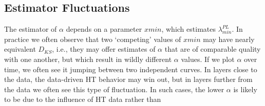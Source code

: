 
\subsection{Estimator Fluctuations}
The estimator of $\alpha$ depends on a parameter $xmin$, which estimates $\lambda_{min}^{PL}$. In practice we often 
observe that two `competing' values of $xmin$ may have nearly equivalent $D_{KS}$, i.e., they may offer estimates of 
$\alpha$ that are of comparable quality with one another, but which result in wildly different $\alpha$ values. If we 
plot $\alpha$ over time, we often see it jumping between two independent curves. In layers close to the data, the 
data-driven HT behavior may win out, but in layers further from the data we often see this type of fluctuation. In such 
cases, the lower $\alpha$ is likely to be due to the influence of HT data rather than 

